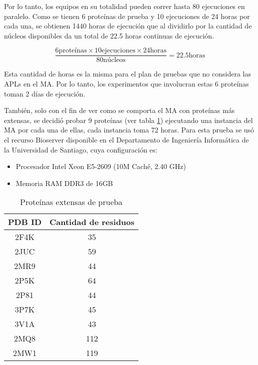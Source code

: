 Por lo tanto, los equipos en su totalidad pueden correr hasta 80 ejecuciones en paralelo. Como se tienen 6 proteínas de prueba y 10 ejecuciones de 24 horas por cada una, se obtienen 1440 horas de ejecución que al dividirlo por la cantidad de núcleos disponibles da un total de 22.5 horas continuas de ejecución.

\begin{equation}
	\frac{6\text{proteínas}{\times}10\text{ejecuciones}{\times}24\text{horas}}{80\text{núcleos}} = 22.5\text{horas}
\end{equation}

Esta cantidad de horas es la misma para el plan de pruebas que no considera las APLs en el MA. Por lo tanto, los experimentos que involucran estas 6 proteínas toman 2 días de ejecución.

También, solo con el fin de ver como se comporta el MA con proteínas más extensas, se decidió probar 9 proteínas (ver tabla \ref{table:prot-ext}) ejecutando una instancia del MA por cada una de ellas, cada instancia toma 72 horas. Para esta prueba se usó el recurso Bioserver disponible en el Departamento de Ingeniería Informática de la Universidad de Santiago, cuya configuración es:

\begin{itemize}
\item Procesador Intel Xeon E5-2609 (10M Caché, 2.40 GHz)
\item Memoria RAM DDR3 de 16GB
\end{itemize}


\begin{table}[h]
	\centering
	\caption{Proteínas extensas de prueba}
	\begin{tabular}{|c|c|}
		\hline
		\textbf{PDB ID} & \textbf{Cantidad de residuos} \\ \hline
		 2F4K & 35\\
         2JUC & 59\\
         2MR9 & 44\\
         2P5K & 64\\
         2P81 & 44\\
         3P7K & 45\\
         3V1A & 43\\
         2MQ8 & 112\\
         2MW1 & 119\\ \hline
	\end{tabular}
	\label{table:prot-ext}
\end{table}


